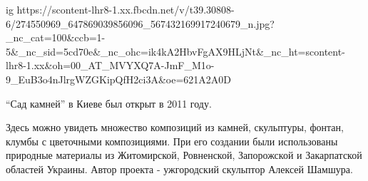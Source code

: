  
 
 
 
 

\ifcmt
  ig https://scontent-lhr8-1.xx.fbcdn.net/v/t39.30808-6/274550969_647869039856096_567432169917240679_n.jpg?_nc_cat=100&ccb=1-5&_nc_sid=5cd70e&_nc_ohc=ik4kA2HbvFgAX9HLjNt&_nc_ht=scontent-lhr8-1.xx&oh=00_AT_MVYXQ7A-JmF_M1o-9_EuB3o4nJlrgWZGKipQfH2ci3A&oe=621A2A0D
\fi

\enquote{Сад камней} в Киеве был открыт в 2011 году.

Здесь можно увидеть множество композиций из камней, скульптуры, фонтан, клумбы
с цветочными композициями. При его создании были использованы природные
материалы из Житомирской, Ровненской, Запорожской и Закарпатской областей
Украины. Автор проекта - ужгородский скульптор Алексей Шамшура.
